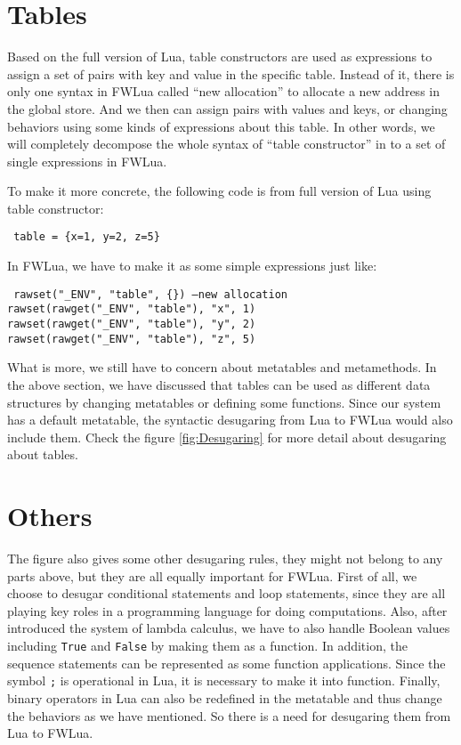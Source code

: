 \section{Tables}
Based on the full version of Lua, table constructors are used as expressions to assign a set of pairs with key and value in the specific table. Instead of it, there is only one syntax in FWLua called ``new allocation'' to allocate a new address in the global store. And we then can assign pairs with values and keys, or changing behaviors using some kinds of expressions about this table. In other words, we will completely decompose the whole syntax of ``table constructor'' in to a set of single expressions in FWLua. 

To make it more concrete, the following code is from full version of Lua using table constructor:
\begin{flushleft}
{\tt
table = \{x=1, y=2, z=5\}\\
}
\end{flushleft}
In FWLua, we have to make it as some simple expressions just like:
\begin{flushleft}
{\tt
rawset("\_ENV", "table", \{\}) --new allocation\\
rawset(rawget("\_ENV", "table"), "x", 1)\\
rawset(rawget("\_ENV", "table"), "y", 2)\\
rawset(rawget("\_ENV", "table"), "z", 5)\\
}
\end{flushleft}

What is more, we still have to concern about metatables and metamethods. In the above section, we have discussed that tables can be used as different data structures by changing metatables or defining some functions. Since our system has a default metatable, the syntactic desugaring from Lua to FWLua would also include them. Check the figure \ref{fig:Desugaring} for more detail about desugaring about tables.

\section{Others}
The figure also gives some other desugaring rules, they might not belong to any parts above, but they are all equally important for FWLua. First of all, we choose to desugar conditional statements and loop statements, since they are all playing key roles in a programming language for doing computations. Also, after introduced the system of lambda calculus, we have to also handle Boolean values including {\tt True} and {\tt False} by making them as a function. In addition, the sequence statements can be represented as some function applications. Since the symbol {\tt ;} is operational in Lua, it is necessary to make it into function. Finally, binary operators in Lua can also be redefined in the metatable and thus change the behaviors as we have mentioned. So there is a need for desugaring them from Lua to FWLua.



